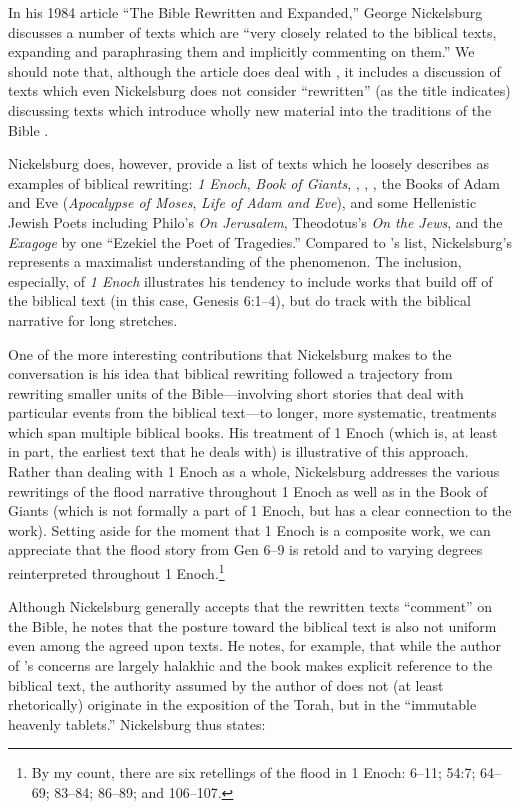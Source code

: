 In his 1984 article ``The Bible Rewritten and Expanded,'' George Nickelsburg discusses a number of texts which are ``very closely related to the biblical texts, expanding and paraphrasing them and implicitly commenting on them.''\autocite[89]{nickelsburg_stone1984} We should note that, although the article does deal with \rwb, it includes a discussion of texts which even Nickelsburg does not consider ``rewritten'' (as the title indicates) discussing texts which introduce wholly new material into the traditions of the Bible \autocite[89--90]{nickelsburg_stone1984}. 

 Nickelsburg does, however, provide a list of texts which he loosely describes as examples of biblical rewriting: \emph{1 Enoch}, \emph{Book of Giants}, \jub, \ga, \ant, the Books of Adam and Eve (\emph{Apocalypse of Moses}, \emph{Life of Adam and Eve}), and some Hellenistic Jewish Poets including Philo's \emph{On Jerusalem}, Theodotus's \emph{On the Jews}, and the \emph{Exagoge} by one ``Ezekiel the Poet of Tragedies.'' Compared to \vermes's list, Nickelsburg's represents a maximalist understanding of the \rwb phenomenon. The inclusion, especially, of \emph{1 Enoch} illustrates his tendency to include works that build off of the biblical text (in this case, Genesis 6:1--4), but do track with the biblical narrative for long stretches. 

 One of the more interesting contributions that Nickelsburg makes to the conversation is his idea that biblical rewriting followed a trajectory from rewriting smaller units of the Bible---involving short stories that deal with particular events from the biblical text---to longer, more systematic, treatments which span multiple biblical books. His treatment of 1 Enoch (which is, at least in part, the earliest text that he deals with) is illustrative of this approach. Rather than dealing with 1 Enoch as a whole, Nickelsburg addresses the various rewritings of the flood narrative throughout 1 Enoch as well as in the Book of Giants (which is not formally a part of 1 Enoch, but has a clear connection to the work). Setting aside for the moment that 1 Enoch is a composite work, we can appreciate that the flood story from Gen 6--9 is retold and to varying degrees reinterpreted throughout 1 Enoch.\footnote{By my count, there   are six retellings of the flood in 1 Enoch: 6--11; 54:7; 64--69;   83--84; 86--89; and 106--107.} 

 Although Nickelsburg generally accepts that the rewritten texts ``comment'' on the Bible, he notes that the posture toward the biblical text is also not uniform even among the agreed upon \rwb texts. He notes, for example, that while the author of \jub's concerns are largely halakhic and the book makes explicit reference to the biblical text, the authority assumed by the author of \jub does not (at least rhetorically) originate in the exposition of the Torah, but in the ``immutable heavenly tablets.''\autocite[100--101]{nickelsburg_stone1984} Nickelsburg thus states: 


